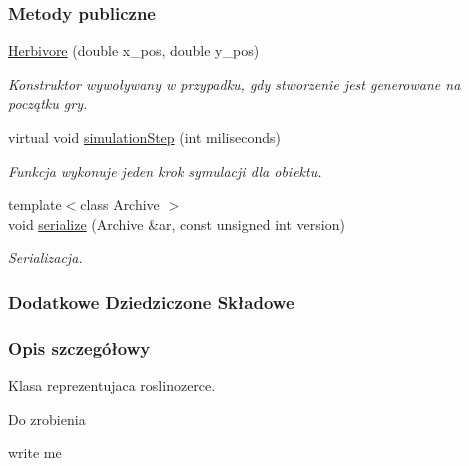 \subsubsection*{Metody publiczne}
\begin{DoxyCompactItemize}
\item 
\hyperlink{classHerbivore_a2174349eed9903363d2840e0484a61d5}{Herbivore} (double x\-\_\-pos, double y\-\_\-pos)
\begin{DoxyCompactList}\small\item\em Konstruktor wywoływany w przypadku, gdy stworzenie jest generowane na początku gry. \end{DoxyCompactList}\item 
virtual void \hyperlink{classHerbivore_a728f136b4489a168df89dadd244a86a8}{simulation\-Step} (int miliseconds)
\begin{DoxyCompactList}\small\item\em Funkcja wykonuje jeden krok symulacji dla obiektu. \end{DoxyCompactList}\item 
{\footnotesize template$<$class Archive $>$ }\\void \hyperlink{classHerbivore_a05a43de5c6a5fa07fd3091692c3f4e94}{serialize} (Archive \&ar, const unsigned int version)
\begin{DoxyCompactList}\small\item\em Serializacja. \end{DoxyCompactList}\end{DoxyCompactItemize}
\subsubsection*{Dodatkowe Dziedziczone Składowe}


\subsubsection{Opis szczegółowy}
Klasa reprezentujaca roslinozerce. 

\begin{DoxyRefDesc}{Do zrobienia}
\item[\hyperlink{todo__todo000005}{Do zrobienia}]write me \end{DoxyRefDesc}


